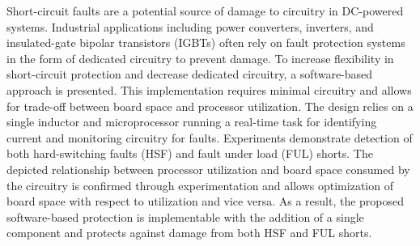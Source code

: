 \documentclass[11pt,oneside]{report}
\begin{document}
    
    \linespread{1.0}
    
    
    
    Short-circuit faults are a potential source of damage to circuitry in DC-powered systems. Industrial applications including power converters, inverters, and insulated-gate bipolar transistors (IGBTs) often rely on fault protection systems in the form of dedicated circuitry to prevent damage. To increase flexibility in short-circuit protection and decrease dedicated circuitry, a software-based approach is presented. This implementation requires minimal circuitry and allows for trade-off between board space and processor utilization. The design relies on a single inductor and microprocessor running a real-time task for identifying current and monitoring circuitry for faults. Experiments demonstrate detection of both hard-switching faults (HSF) and fault under load (FUL) shorts. The depicted relationship between processor utilization and board space consumed by the circuitry is confirmed through experimentation and allows optimization of board space with respect to utilization and vice versa. As a result, the proposed software-based protection is implementable with the addition of a single component and protects against damage from both HSF and FUL shorts.
    
\end{document}
